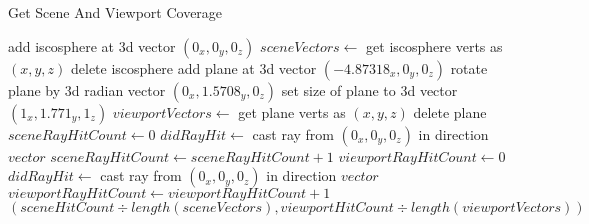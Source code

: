 ﻿\documentclass[a4paper]{article}
\begin{document}
    \begin{algorithm}
        \caption{Get Scene And Viewport Coverage}\label{alg:cap}
        \begin{algorithmic}[1]
            \State add iscosphere at 3d vector $(0_x,0_y,0_z)$
            \State $sceneVectors \gets$ get iscosphere verts as $(x,y,z)$
            \State delete iscosphere
            \State
            \State add plane at 3d vector $(-4.87318_x,0_y,0_z)$
            \State rotate plane by 3d radian vector $(0_x,1.5708_y,0_z)$
            \State set size of plane to 3d vector $(1_x,1.771_y,1_z)$
            \State $viewportVectors \gets$ get plane verts as $(x,y,z)$
            \State delete plane
            \State
            \State $sceneRayHitCount \gets 0$
                \State $didRayHit \gets$ cast ray from $(0_x,0_y,0_z)$ in direction $vector$
                    \State $sceneRayHitCount \gets sceneRayHitCount+1$
                \EndIf
            \EndFor
            \State
            \State $viewportRayHitCount \gets 0$
                \State $didRayHit \gets$ cast ray from $(0_x,0_y,0_z)$ in direction $vector$
                    \State $viewportRayHitCount \gets viewportRayHitCount+1$
                \EndIf
            \EndFor
            \State
            \Return $(sceneHitCount \div length(sceneVectors),viewportHitCount \div length(viewportVectors))$
        \end{algorithmic}
    \end{algorithm}
\end{document}
